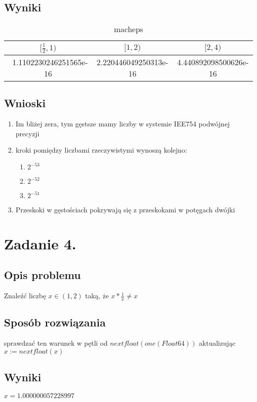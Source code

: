 \documentclass[12pt]{article}
\begin{document}
\subsection{Wyniki}
\begin{table}[h]
    \caption{macheps}
    \label{macheps1}
    \begin{tabular}{|c|c|c|}
        \hline 
        \textbf{$[\frac{1}{2}, 1)$} & \textbf{$[1, 2)$} & \textbf{$[2, 4)$}\\
        \hline
        \ 1.1102230246251565e-16 & 2.220446049250313e-16 & 4.440892098500626e-16\\
        \hline
    \end{tabular} 
\end{table}
\subsection{Wnioski}
\begin{enumerate}
    \item Im bliżej zera, tym gęstsze mamy liczby w systemie IEE754 podwójnej precyzji
    \item kroki pomiędzy liczbami rzeczywistymi wynoszą kolejno:
    \begin{enumerate}
        \item ${2^{-53}}$
        \item ${2^{-52}}$
        \item ${2^{-51}}$
    \end{enumerate}
    \item Przeskoki w gęstościach pokrywają się z przeskokami w potęgach dwójki
\end{enumerate}
\section{Zadanie 4.}

\subsection{Opis problemu}
Znaleźć liczbę $x \in (1, 2)$ taką, że $x * \frac{1}{x} \neq x $
\subsection{Sposób rozwiązania}
sprawdzać ten warunek w pętli od $nextfloat(one(Float64))$ aktualizując\\
$x := nextfloat(x)$
\subsection{Wyniki}
$x = 1.000000057228997$
\end{document}
